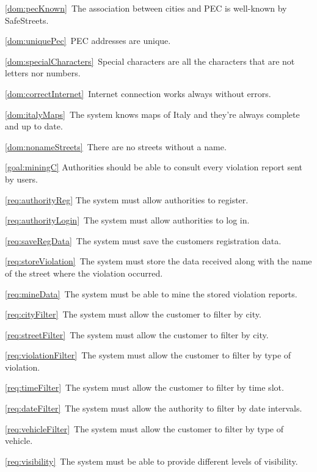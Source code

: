 \begin{description}
\begin{description}
\begin{description}
							\item \ref{dom:pecKnown}\ The association between cities and PEC is well-known by SafeStreets.
							\item \ref{dom:uniquePec}\ PEC addresses are unique.
							\item \ref{dom:specialCharacters}\ Special characters are all the characters that are not letters nor numbers.
							\item \ref{dom:correctInternet}\ Internet connection works always without errors.
							\item \ref{dom:italyMaps}\ The system knows maps of Italy and they’re always complete and up to date.
							\item \ref{dom:nonameStreets}\ There are no streets without a name.
						\end{description}
					\item \ref{goal:miningC} Authorities should be able to consult every violation report sent by users.
						\begin{description}
							\item \ref{req:authorityReg} The system must allow authorities to register.
							\item \ref{req:authorityLogin}\ The system must allow authorities to log in.
							\item \ref{req:saveRegData}\ The system must save the customers registration data.
							\item \ref{req:storeViolation}\ The system must store the data received along with the name of the street where the violation occurred.
							\item \ref{req:mineData}\ The system must be able to mine the stored violation reports.
							\item \ref{req:cityFilter}\ The system must allow the customer to filter by city.
							\item \ref{req:streetFilter}\ The system must allow the customer to filter by city.
							\item \ref{req:violationFilter}\ The system must allow the customer to filter by type of violation.
							\item \ref{req:timeFilter}\ The system must allow the customer to filter by time slot.
							\item \ref{req:dateFilter}\ The system must allow the authority to filter by date intervals.
							\item \ref{req:vehicleFilter}\ The system must allow the customer to filter by type of vehicle.
							\item \ref{req:visibility}\ The system must be able to provide different levels of visibility.

\end{description}
\end{description}
\end{description}

